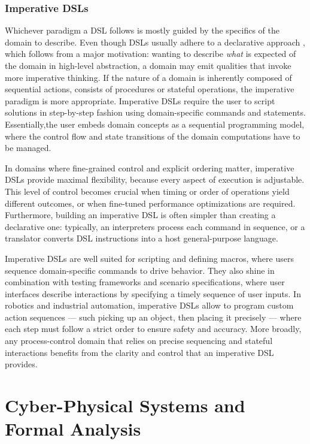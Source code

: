 \documentclass[11pt]{report}
\begin{document}
\subsection{Imperative DSLs}

Whichever paradigm a DSL follows is mostly guided by the specifics of the domain to describe. Even though DSLs usually adhere to a declarative approach \cite{sigplanDSL}, which follows from a
major motivation: wanting to describe \textit{what} is expected of the domain in high-level abstraction, a domain may emit qualities that invoke more imperative thinking.
If the nature of a domain is inherently composed of sequential actions, consists of procedures or stateful operations, the imperative paradigm is more appropriate.
Imperative DSLs require the user to script solutions in step-by-step fashion using domain-specific commands and statements. Essentially,the user embeds domain concepts as a sequential programming model,
where the control flow and state transitions of the domain computations have to be managed.

In domains where fine-grained control and explicit ordering matter, imperative DSLs provide maximal flexibility, because every aspect of execution is adjustable.
This level of control becomes crucial when timing or order of operations yield different outcomes, or when fine-tuned performance optimizations are required.
Furthermore, building an imperative DSL is often simpler than creating a declarative one: typically, an interpreters process each command in sequence, 
or a translator converts DSL instructions into a host general-purpose language. \cite{}


Imperative DSLs are well suited for scripting and defining macros, where users sequence domain-specific commands to drive behavior. They also shine in combination with testing
frameworks and scenario specifications, where user interfaces describe interactions by specifying a timely sequence of user inputs. In robotics and industrial automation, 
imperative DSLs allow to program custom action sequences — such picking up an object, then placing it precisely — where each step must follow a
strict order to ensure safety and accuracy. More broadly, any process-control domain that relies on precise sequencing and stateful interactions benefits from the clarity
and control that an imperative DSL provides.

\chapter{Cyber-Physical Systems and Formal Analysis}
\end{document}
